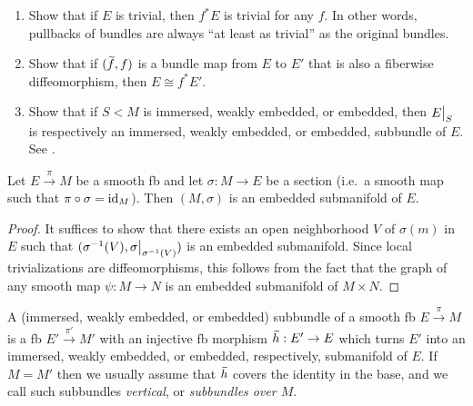 \begin{xca}\label{example 2.7.3 RS1}
\begin{enumerate}
    \item Show that if $E$ is trivial, then $f^\ast E$ is trivial for any $f$. In other words, pullbacks of bundles are always ``at least as trivial'' as the original bundles.
    \item Show that if $(\wt{f},f)$ is a bundle map from $E$ to $E'$ that is also a fiberwise diffeomorphism, then $E\cong f^\ast E'$.
    \item Show that if $S<M$ is immersed, weakly embedded, or embedded, then $\restr{E}{S}$ is respectively an immersed, weakly embedded, or embedded, subbundle of $E$. See \cite[Example~2.7.3]{RS1}.
\end{enumerate}
\end{xca}



\begin{prop}
    Let $E\overset{\pi}{\to}M$ be a smooth \gls{fb} and let $\sigma:M\to E$ be a section (i.e.~a smooth map such that $\pi\circ\sigma=\operatorname{id}_M$). Then $(M,\sigma)$ is an embedded submanifold of $E$.
\end{prop}
\begin{proof}
    It suffices to show that there exists an open neighborhood $V$ of $\sigma(m)$ in $E$ such that $(\sigma^{-1}(V),\restr{\sigma}{\sigma^{-1}(V)})$ is an embedded submanifold. Since local trivializations are diffeomorphisms, this follows from the fact that the graph of any smooth map $\psi:M\to N$ is an embedded submanifold of $M\times N$.
\end{proof}



\begin{defn}
    A (immersed, weakly embedded, or embedded) subbundle of a smooth \gls{fb} $E\overset{\pi}{\to}M$ is a \gls{fb} $E'\overset{\pi'}{\to}M'$ with an injective \gls{fb} morphism $\wt{h}:E'\to E$ which turns $E'$ into an immersed, weakly embedded, or embedded, respectively, submanifold of $E$. If $M=M'$ then we usually assume that $\wt{h}$ covers the identity in the base, and we call such subbundles \emph{vertical}, or \emph{subbundles over $M$}. 
\end{defn}

